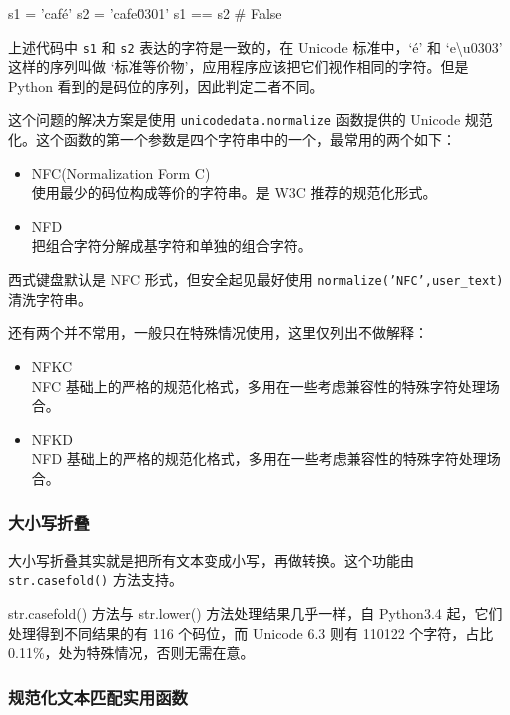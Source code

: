 \begin{python}
s1 = 'café'
s2 = 'cafe\u0301'
s1 == s2            # False
\end{python}

上述代码中 \texttt{s1} 和 \texttt{s2} 表达的字符是一致的，在 Unicode 标准中，`é' 和 `e\textbackslash u0303' 这样的序列叫做 `标准等价物'，应用程序应该把它们视作相同的字符。但是 Python 看到的是码位的序列，因此判定二者不同。

这个问题的解决方案是使用 \texttt{unicodedata.normalize} 函数提供的 Unicode 规范化。这个函数的第一个参数是四个字符串中的一个，最常用的两个如下：

\begin{itemize}
    \item NFC(Normalization Form C)\\
    使用最少的码位构成等价的字符串。是 W3C 推荐的规范化形式。
    \item NFD \\
    把组合字符分解成基字符和单独的组合字符。
\end{itemize}

西式键盘默认是 NFC 形式，但安全起见最好使用 \texttt{normalize('NFC',user\_text)} 清洗字符串。

还有两个并不常用，一般只在特殊情况使用，这里仅列出不做解释：

\begin{itemize}
    \item NFKC \\
    NFC 基础上的严格的规范化格式，多用在一些考虑兼容性的特殊字符处理场合。
    \item NFKD \\
    NFD 基础上的严格的规范化格式，多用在一些考虑兼容性的特殊字符处理场合。
\end{itemize}

\subsubsection{大小写折叠}

大小写折叠其实就是把所有文本变成小写，再做转换。这个功能由 \texttt{str.casefold()} 方法支持。

str.casefold() 方法与 str.lower() 方法处理结果几乎一样，自 Python3.4 起，它们处理得到不同结果的有 116 个码位，而 Unicode 6.3 则有 110122 个字符，占比 0.11\%，处为特殊情况，否则无需在意。

\subsubsection{规范化文本匹配实用函数}

